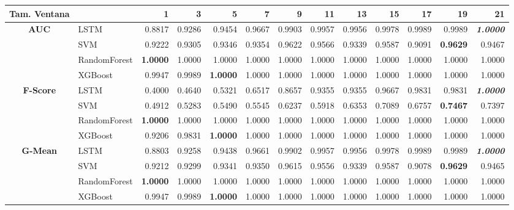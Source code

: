 \begin{table}[H]
\centering
\begin{adjustbox}{max width=14cm}
	\begin{tabular}{|c|l|r|r|r|r|r|r|r|r|r|r|r|}
		\hline
		\textbf{Tam. Ventana}&         &      1  &      3  &      5  &      7  &      9  &      11 &      13 &      15 &      17 &      19 &      21 \\
		\hline
		\textbf{AUC} &  LSTM &  0.8817 &  0.9286 &  0.9454 &  0.9667 &  0.9903 &  0.9957 &  0.9956 &  0.9978 &  0.9989 &  0.9989 & \textit{ \textbf{  1.0000 } } \\
		&  SVM &  0.9222 &  0.9305 &  0.9346 &  0.9354 &  0.9622 &  0.9566 &  0.9339 &  0.9587 &  0.9091 & \textbf{  0.9629 } &  0.9467 \\
		&  RandomForest & \textbf{  1.0000 } &  1.0000 &  1.0000 &  1.0000 &  1.0000 &  1.0000 &  1.0000 &  1.0000 &  1.0000 &  1.0000 &  1.0000 \\
		&  XGBoost &  0.9947 &  0.9989 & \textbf{  1.0000 } &  1.0000 &  1.0000 &  1.0000 &  1.0000 &  1.0000 &  1.0000 &  1.0000 &  1.0000 \\
		\hline
		\textbf{F-Score} &  LSTM &  0.4000 &  0.4640 &  0.5321 &  0.6517 &  0.8657 &  0.9355 &  0.9355 &  0.9667 &  0.9831 &  0.9831 & \textit{ \textbf{  1.0000 } } \\
		&  SVM &  0.4912 &  0.5283 &  0.5490 &  0.5545 &  0.6237 &  0.5918 &  0.6353 &  0.7089 &  0.6757 & \textbf{  0.7467 } &  0.7397 \\
		&  RandomForest & \textbf{  1.0000 } &  1.0000 &  1.0000 &  1.0000 &  1.0000 &  1.0000 &  1.0000 &  1.0000 &  1.0000 &  1.0000 &  1.0000 \\
		&  XGBoost &  0.9206 &  0.9831 & \textbf{  1.0000 } &  1.0000 &  1.0000 &  1.0000 &  1.0000 &  1.0000 &  1.0000 &  1.0000 &  1.0000 \\
		\hline
		\textbf{G-Mean} &  LSTM &  0.8803 &  0.9258 &  0.9438 &  0.9661 &  0.9902 &  0.9957 &  0.9956 &  0.9978 &  0.9989 &  0.9989 & \textit{ \textbf{  1.0000 } } \\
		&  SVM &  0.9212 &  0.9299 &  0.9341 &  0.9350 &  0.9615 &  0.9556 &  0.9339 &  0.9587 &  0.9078 & \textbf{  0.9629 } &  0.9465 \\
		&  RandomForest & \textbf{  1.0000 } &  1.0000 &  1.0000 &  1.0000 &  1.0000 &  1.0000 &  1.0000 &  1.0000 &  1.0000 &  1.0000 &  1.0000 \\
		&  XGBoost &  0.9947 &  0.9989 & \textbf{  1.0000 } &  1.0000 &  1.0000 &  1.0000 &  1.0000 &  1.0000 &  1.0000 &  1.0000 &  1.0000 \\

\end{tabular}
\end{adjustbox}
\end{table}
